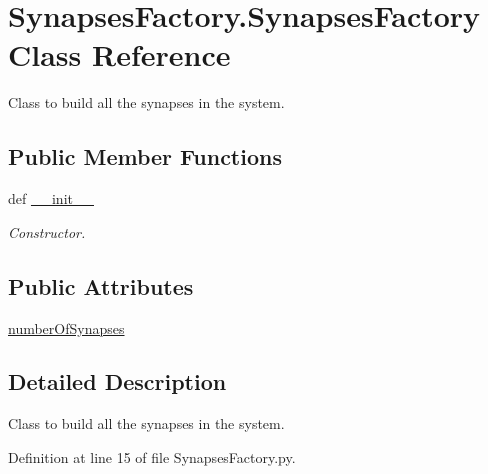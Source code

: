 \hypertarget{class_synapses_factory_1_1_synapses_factory}{\section{Synapses\-Factory.\-Synapses\-Factory Class Reference}
\label{class_synapses_factory_1_1_synapses_factory}
}


Class to build all the synapses in the system.  


\subsection*{Public Member Functions}
\begin{DoxyCompactItemize}
\item 
def \hyperlink{class_synapses_factory_1_1_synapses_factory_a8b653e2419b9b65dd5b9feb89faf0eb4}{\-\_\-\-\_\-init\-\_\-\-\_\-}
\begin{DoxyCompactList}\small\item\em Constructor. \end{DoxyCompactList}\end{DoxyCompactItemize}
\subsection*{Public Attributes}
\begin{DoxyCompactItemize}
\item 
\hyperlink{class_synapses_factory_1_1_synapses_factory_af83fbc27851417b677391ece9bf49a29}{number\-Of\-Synapses}
\end{DoxyCompactItemize}


\subsection{Detailed Description}
Class to build all the synapses in the system. 

Definition at line 15 of file Synapses\-Factory.\-py.



